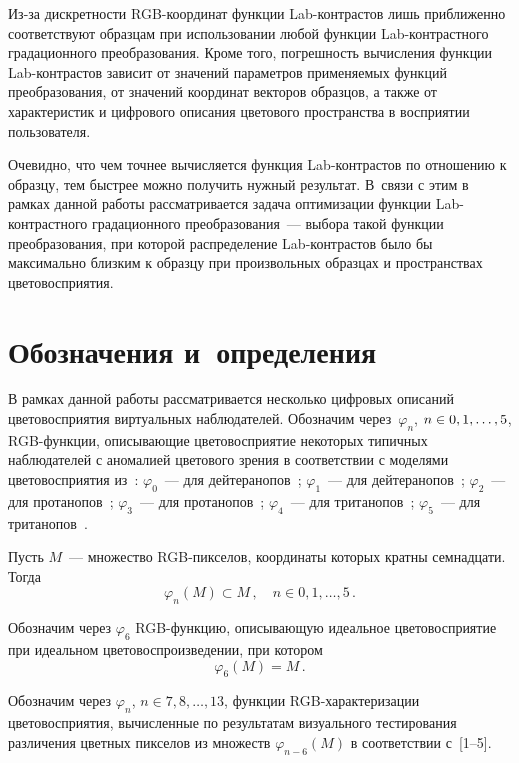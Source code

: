 \begin{multicols}{2}
  Из-за дискретности RGB-ко\-ор\-ди\-нат функции Lab-конт\-рас\-тов лишь 
приближенно соответствуют образцам при использовании любой функции 
  Lab-конт\-раст\-но\-го градационного преобразования. Кроме того, 
погрешность вычисления функции Lab-конт\-рас\-тов зависит от значений 
параметров применяемых функций преобразования, от значений координат 
векторов образцов, а также от характеристик и цифрового описания цветового 
пространства в восприятии пользователя. 
  
  Очевидно, что чем точнее вычисляется функция Lab-конт\-рас\-тов по 
отношению к образцу, тем быст\-рее можно получить нужный результат. 
В~связи с этим в рамках данной работы рассматривается задача оптимизации 
функции Lab-конт\-раст\-но\-го градационного преобразования~--- выбора 
такой функции преобразования, при которой распределение Lab-конт\-рас\-тов 
было бы максимально близким к образцу при произвольных образцах и 
пространствах цветовосприятия. 

\section{Обозначения и~определения}
  
  В рамках данной работы рассматривается несколько цифровых описаний 
цветовосприятия виртуальных наблюдателей. Обозначим через~$\varphi_n$,\linebreak 
$n\hm\in 0, 1, \ldots , 5$, RGB-функ\-ции, описывающие цветовосприятие 
некоторых типичных наблюдателей с аномалией цветового зрения в 
соответствии с моделями цветовосприятия из~\cite{10-ar, 11-ar}: $\varphi_0$~--- 
для дейтеранопов~\cite{10-ar}; $\varphi_1$~--- для дейтеранопов~\cite{11-ar}; 
$\varphi_2$~--- для протанопов~\cite{10-ar}; $\varphi_3$~--- для 
протанопов~\cite{11-ar}; $\varphi_4$~--- для тританопов~\cite{10-ar}; 
  $\varphi_5$~--- для тританопов~\cite{11-ar}. 
  
  Пусть $M$~--- множество RGB-пик\-се\-лов, координаты которых кратны 
семнадцати. Тогда
  $$
  \varphi_n(M)\subset M\,,\quad  n\in 0, 1, \ldots , 5\,.
  $$
  
  Обозначим через $\varphi_6$ RGB-функ\-цию, описывающую идеальное 
цветовосприятие при идеальном цветовоспроизведении, при котором
  $$
  \varphi_6(M) = M\,.
  $$
  
  Обозначим через $\varphi_n$, $n\in7, 8, \ldots , 13$, функции 
  RGB-ха\-рак\-те\-ри\-за\-ции цветовосприятия, вычисленные по результатам 
визуального тестирования различения цветных пикселов из множеств 
$\varphi_{n-6}(M)$ в соответствии с~[1--5].
  

\end{multicols}

